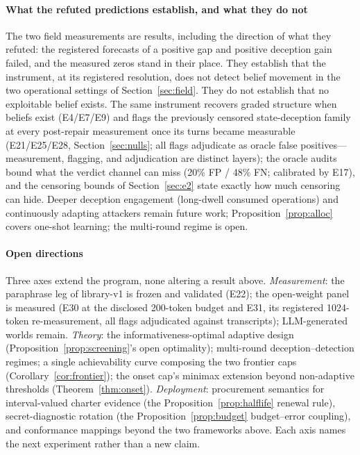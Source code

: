 \paragraph{What the refuted predictions establish, and what they do not}
The two field measurements are results, including the direction of what
they refuted: the registered forecasts of a positive gap and positive
deception gain failed, and the measured zeros stand in their place. They establish
that the instrument, at its registered resolution, does not detect belief
movement in the two operational settings of Section~\ref{sec:field}. They do not establish
that no exploitable belief exists. The same instrument recovers graded
structure when beliefs exist (E4/E7/E9) and flags the previously censored
state-deception family at every post-repair measurement once its turns
became measurable (E21/E25/E28, Section~\ref{sec:nulls}; all flags
adjudicate as oracle false positives---measurement, flagging, and
adjudication are distinct layers); the oracle audits bound what the verdict
channel can miss (20\% FP / 48\% FN; calibrated by E17), and the censoring
bounds of Section~\ref{sec:e2} state exactly how much censoring can hide. Deeper
deception engagement (long-dwell consumed operations) and continuously
adapting attackers remain future work; Proposition~\ref{prop:alloc} covers
one-shot learning; the multi-round regime is open.

\paragraph{Open directions}
Three axes extend the program, none altering a result above.
\emph{Measurement}: the paraphrase leg of library-v1 is frozen and
validated (E22); the open-weight panel is measured (E30 at the disclosed
200-token budget and E31, its registered 1024-token re-measurement, all
flags adjudicated against transcripts);
LLM-generated worlds remain.
\emph{Theory}: the informativeness-optimal adaptive design
(Proposition~\ref{prop:screening}'s open optimality); multi-round
deception--detection regimes; a single achievability curve composing the
two frontier caps (Corollary~\ref{cor:frontier}); the onset cap's minimax
extension beyond non-adaptive thresholds (Theorem~\ref{thm:onset}).
\emph{Deployment}: procurement semantics for interval-valued charter
evidence (the Proposition~\ref{prop:halflife} renewal rule),
secret-diagnostic rotation (the Proposition~\ref{prop:budget}
budget--error coupling), and conformance mappings beyond the two
frameworks above. Each axis names the next experiment rather than a new
claim.

